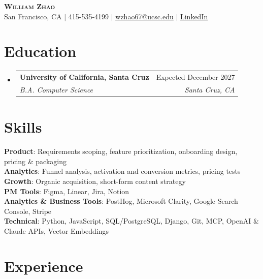 \documentclass[letterpaper,11pt]{article}
\makeatletter
\newcommand{\resumeSubheading}[4]{
  \vspace{-2pt}\item
    \begin{tabular*}{0.97\textwidth}[t]{l@{\extracolsep{\fill}}r}
      \textbf{#1} & #2 \\
      \textit{\small #3} & \textit{\small #4} \\
    \end{tabular*}\vspace{-7pt}
}
\newcommand{\resumeSubHeadingListStart}{
  \begin{itemize}[leftmargin=0.15in, label={}]
}
\newcommand{\resumeSubHeadingListEnd}{
  \end{itemize}
}
\makeatother
\begin{document}

\begin{center}
  \textbf{\Huge \scshape William Zhao} \\ \vspace{1pt}
  \small
  San Francisco, CA $|$
  415-535-4199 $|$
  \href{mailto:wzhao67@ucsc.edu}
  {\underline{wzhao67@ucsc.edu}} $|$
  \href{https://www.linkedin.com/in/william-z-b386b4427/}
  {\underline{LinkedIn}}
\end{center}


\section{Education}

\resumeSubHeadingListStart

\resumeSubheading
  {University of California, Santa Cruz}
  {Expected December 2027}
  {B.A. Computer Science}
  {Santa Cruz, CA}

\resumeSubHeadingListEnd


\section{Skills}

\begin{itemize}[leftmargin=0.15in, label={}]
  \small{\item{
    \textbf{Product}{: Requirements scoping, feature prioritization,
    onboarding design, pricing \& packaging} \\
    \textbf{Analytics}{: Funnel analysis, activation and conversion metrics,
    pricing tests} \\
    \textbf{Growth}{: Organic acquisition, short-form content strategy} \\
    \textbf{PM Tools}{: Figma, Linear, Jira, Notion} \\
    \textbf{Analytics \& Business Tools}{: PostHog, Microsoft Clarity,
    Google Search Console, Stripe} \\
    \textbf{Technical}{: Python, JavaScript, SQL/PostgreSQL, Django,
    Git, MCP, OpenAI \& Claude APIs, Vector Embeddings}
  }}
\end{itemize}


\section{Experience}
\end{document}
